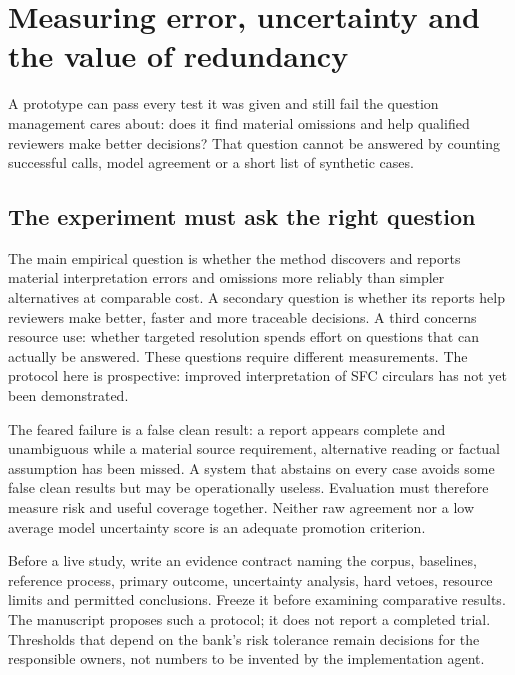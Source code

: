 \chapter{Measuring error, uncertainty and the value of redundancy}
\label{ch:evaluation}

A prototype can pass every test it was given and still fail the question
management cares about: does it find material omissions and help qualified
reviewers make better decisions? That question cannot be answered by counting
successful calls, model agreement or a short list of synthetic cases.

\section{The experiment must ask the right question}
\label{merge:M09:00}


The main empirical question is whether the method discovers and reports material
interpretation errors and omissions more reliably than simpler alternatives at
comparable cost. A secondary question is whether its reports help reviewers make
better, faster and more traceable decisions. A third concerns resource use:
whether targeted resolution spends effort on questions that can actually be
answered. These questions require different measurements. The protocol here is
prospective: improved interpretation of SFC circulars has not yet been demonstrated.


The feared failure is a false clean result: a report appears complete and
unambiguous while a material source requirement, alternative reading or factual
assumption has been missed. A system that abstains on every case avoids some false
clean results but may be operationally useless. Evaluation must therefore measure
risk and useful coverage together. Neither raw agreement nor a low average model
uncertainty score is an adequate promotion criterion.

Before a live study, write an evidence contract naming the corpus, baselines,
reference process, primary outcome, uncertainty analysis, hard vetoes, resource
limits and permitted conclusions. Freeze it before examining comparative results.
The manuscript proposes such a protocol; it does not report a completed trial.
Thresholds that depend on the bank's risk tolerance remain decisions for the
responsible owners, not numbers to be invented by the implementation agent.


